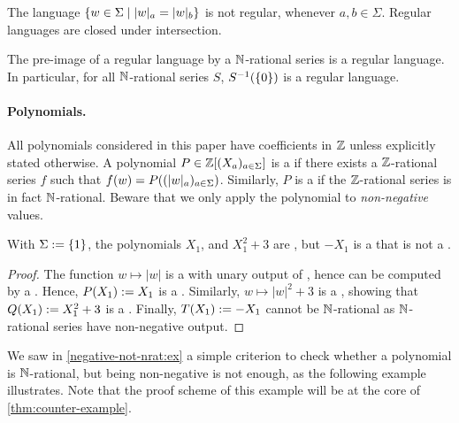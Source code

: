 \documentclass[sigconf,natbib=false,screen, review,anonymous]{acmart}
\begin{document}
\begin{fact}
    \label{regular:fact}
    The language $\setof{ w \in \Sigma}{ \card[a]{w} = \card[b]{w}}$
    is not regular, whenever $a,b \in \Sigma$.
    Regular languages are closed under intersection.
\end{fact}

\begin{fact}
    \label{pre-image-regular:fact}
    The pre-image of a regular language by a $\mathbb{N}$-rational series
    is a regular language. In particular,
    for all $\mathbb{N}$-rational series $S$, $S^{-1}(\mathopen{\{} 0 \mathclose{\}})$ is a regular
    language.
\end{fact}



\AP \paragraph*{Polynomials.} All polynomials considered in this paper have
coefficients in $\mathbb{Z}$ unless explicitly stated otherwise. A polynomial $P \in
\mathbb{Z}[(X_a)_{a \in \Sigma}]$ is a  if
there exists a  $\mathbb{Z}$-rational series $f$ such that $f(w)
= P(\seqof{ \card[a]{w} }{a \in \Sigma})$. Similarly, $P$ is a
 if the  $\mathbb{Z}$-rational
series is in fact $\mathbb{N}$-rational. Beware that we only apply the polynomial
to \emph{non-negative} values.

\begin{example}
    \label{negative-not-nrat:ex}
    With $\Sigma \mathrel{:=} \mathopen{\{} 1 \mathclose{\}}$,
    the polynomials $X_1$, and $X_1^2 + 3$ are ,
    but $- X_1$ is a  that is 
    not a .
\end{example}
\begin{proof}
    The function $w \mapsto |w|$ is a  with unary
    output of , hence  can be computed by a
    . Hence, $P(X_1) \mathrel{:=} X_1$ is
    a . Similarly,
    $w \mapsto |w|^2 + 3$ is a ,
    showing that $Q(X_1) \mathrel{:=} X_1^2 + 3$
    is a .
    Finally, 
    $T(X_1) \mathrel{:=} - X_1$ cannot be $\mathbb{N}$-rational as $\mathbb{N}$-rational series
    have non-negative output.
\end{proof}

We saw in \cref{negative-not-nrat:ex}
a simple criterion to check whether a polynomial is $\mathbb{N}$-rational,
but being non-negative is not enough, as the following example
illustrates. Note that the proof scheme
of this example will be at the core of \cref{thm:counter-example}.
\end{document}
